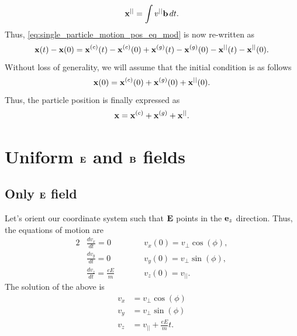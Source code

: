 \documentclass[a4paper,11pt]{report}
\begin{document}
\begin{equation}
    \mathbf{x}^{||} = \int v^{||} \mathbf{b} \, dt.
\end{equation}
Thus, \cref{eq:single_particle_motion_pos_eq_mod} is now re-written as
\begin{equation}
    \mathbf{x}(t) - \mathbf{x}(0) = \mathbf{x}^{(c)}(t) - \mathbf{x}^{(c)}(0) + \mathbf{x}^{(g)}(t) - \mathbf{x}^{(g)}(0) - \mathbf{x}^{||}(t) - \mathbf{x}^{||}(0).
\end{equation}
Without loss of generality, we will assume that the initial condition is as follows
\begin{equation}
    \mathbf{x}(0) = \mathbf{x}^{(c)}(0) + \mathbf{x}^{(g)}(0) + \mathbf{x}^{||}(0).
\end{equation}
Thus, the particle position is finally expressed as
\begin{equation}
    \label{eq:single_particle_motion_pos_general}
    \mathbf{x} = \mathbf{x}^{(c)} + \mathbf{x}^{(g)} + \mathbf{x}^{||}.
\end{equation}


 
\section{Uniform $\mathbf{E}$ and $\mathbf{B}$ fields}

\subsection{Only $\mathbf{E}$ field}
Let's orient our coordinate system such that $\mathbf{E}$ points in the $\mathbf{e}_z$ direction. Thus, the equations of motion are
\begin{alignat}{2}
    &\frac{d v_x}{dt} = 0  \qquad && v_x(0) = v_\perp \cos(\phi), \nonumber \\
    &\frac{d v_y}{dt} = 0  \qquad && v_y(0) = v_\perp \sin(\phi), \nonumber \\
    &\frac{d v_z}{dt} = \frac{e E}{m}  \qquad && v_z(0) = v_{||}.
\end{alignat}
The solution of the above is
\begin{align}
    v_x &= v_\perp \cos(\phi) \nonumber \\
    v_y &= v_\perp \sin(\phi) \nonumber \\
    v_z &= v_{||} + \frac{e E}{m} t.
\end{align}
\end{document}

